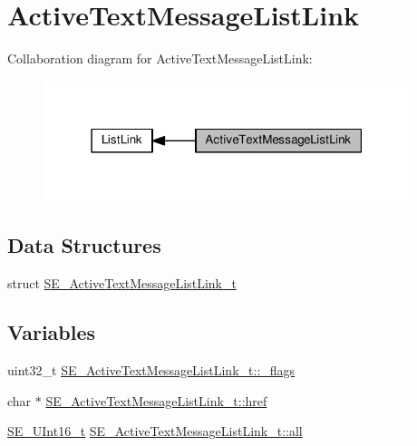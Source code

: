 \hypertarget{group__ActiveTextMessageListLink}{}\section{Active\+Text\+Message\+List\+Link}
\label{group__ActiveTextMessageListLink}
Collaboration diagram for Active\+Text\+Message\+List\+Link\+:\nopagebreak
\begin{figure}[H]
\begin{center}
\leavevmode
\includegraphics[width=303pt]{group__ActiveTextMessageListLink}
\end{center}
\end{figure}
\subsection*{Data Structures}
\begin{DoxyCompactItemize}
\item 
struct \hyperlink{structSE__ActiveTextMessageListLink__t}{S\+E\+\_\+\+Active\+Text\+Message\+List\+Link\+\_\+t}
\end{DoxyCompactItemize}
\subsection*{Variables}
\begin{DoxyCompactItemize}
\item 
uint32\+\_\+t \hyperlink{group__ActiveTextMessageListLink_ga2bfa632d9e5fe1727367092113aafecf}{S\+E\+\_\+\+Active\+Text\+Message\+List\+Link\+\_\+t\+::\+\_\+flags}
\item 
char $\ast$ \hyperlink{group__ActiveTextMessageListLink_gabca12a79cb2612036a2d49ec33f8fa53}{S\+E\+\_\+\+Active\+Text\+Message\+List\+Link\+\_\+t\+::href}
\item 
\hyperlink{group__UInt16_gac68d541f189538bfd30cfaa712d20d29}{S\+E\+\_\+\+U\+Int16\+\_\+t} \hyperlink{group__ActiveTextMessageListLink_ga0fe1d2a7f428daddc9a0ca75931c144e}{S\+E\+\_\+\+Active\+Text\+Message\+List\+Link\+\_\+t\+::all}
\end{DoxyCompactItemize}


